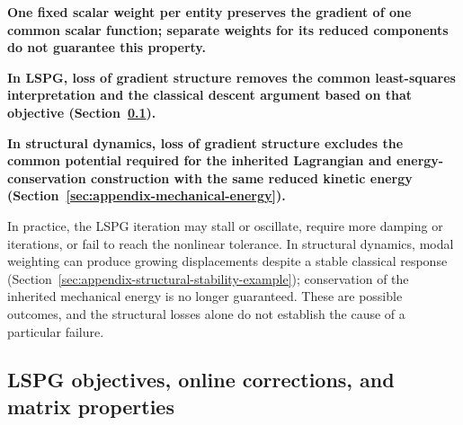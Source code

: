 \documentclass[a4paper,12pt]{article}
\begin{document}
\textbf{One fixed scalar weight per entity preserves the gradient of one common scalar function; separate weights for its reduced components do not guarantee this property.}

\textbf{In LSPG, loss of gradient structure removes the common least-squares interpretation and the classical descent argument based on that objective (Section~\ref{sec:appendix-common-objective}).}

\textbf{In structural dynamics, loss of gradient structure excludes the common potential required for the inherited Lagrangian and energy-conservation construction with the same reduced kinetic energy (Section~\ref{sec:appendix-mechanical-energy}).}

In practice, the LSPG iteration may stall or oscillate, require more damping or iterations, or fail to reach the nonlinear tolerance. In structural dynamics, modal weighting can produce growing displacements despite a stable classical response (Section~\ref{sec:appendix-structural-stability-example}); conservation of the inherited mechanical energy is no longer guaranteed. These are possible outcomes, and the structural losses alone do not establish the cause of a particular failure.

\subsection{LSPG objectives, online corrections, and matrix properties}
\label{sec:appendix-common-objective}
\label{sec:appendix-lspg-foundations}
\end{document}
